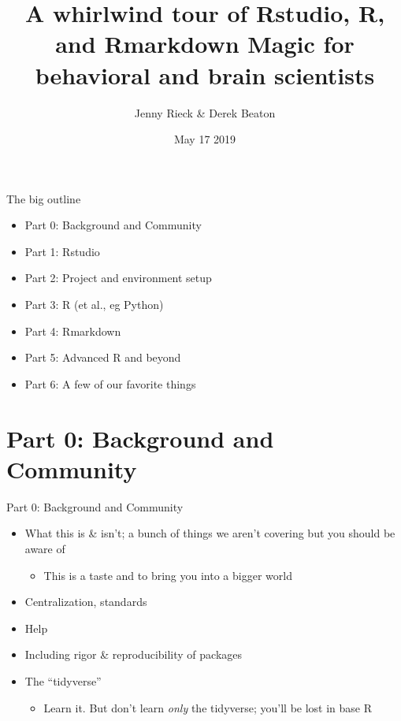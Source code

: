 \documentclass[ignorenonframetext,]{beamer}
\title{A whirlwind tour of Rstudio, R, and Rmarkdown Magic for behavioral and
brain scientists}
\author{Jenny Rieck \& Derek Beaton}
\date{May 17 2019}
\providecommand{\tightlist}{%
  \setlength{\itemsep}{0pt}\setlength{\parskip}{0pt}}
\begin{document}
\frame{\titlepage}

\begin{frame}{The big outline}
\protect\hypertarget{the-big-outline}{}

\begin{itemize}
\tightlist
\item
  Part 0: Background and Community
\item
  Part 1: Rstudio
\item
  Part 2: Project and environment setup
\item
  Part 3: R (et al., eg Python)
\item
  Part 4: Rmarkdown
\item
  Part 5: Advanced R and beyond
\item
  Part 6: A few of our favorite things
\end{itemize}

\end{frame}

\hypertarget{part-0-background-and-community}{%
\section{Part 0: Background and
Community}\label{part-0-background-and-community}}

\begin{frame}{Part 0: Background and Community}
\protect\hypertarget{part-0-background-and-community-1}{}

\begin{itemize}
\tightlist
\item
  What this is \& isn't; a bunch of things we aren't covering but you
  should be aware of

  \begin{itemize}
  \tightlist
  \item
    This is a taste and to bring you into a bigger world
  \end{itemize}
\item
  Centralization, standards
\item
  Help
\item
  Including rigor \& reproducibility of packages
\item
  The ``tidyverse''

  \begin{itemize}
  \tightlist
  \item
    Learn it. But don't learn \emph{only} the tidyverse; you'll be lost
    in base R
  \end{itemize}
\end{itemize}

\end{frame}
\end{document}
